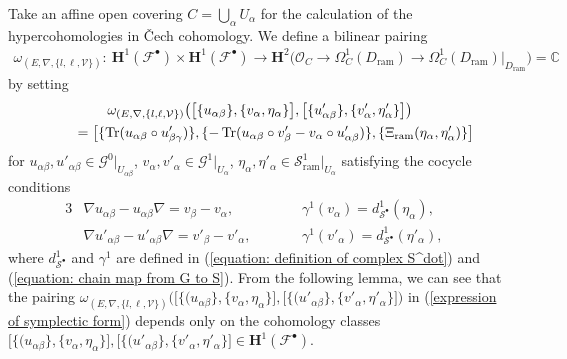 \documentclass[pdftex]{sigma}
\numberwithin{equation}{section}
\newcommand{\Tr}{\mathop{\rm Tr}\nolimits}
\begin{document}
Take an affine open covering
$C=\bigcup_{\alpha} U_{\alpha}$
for the calculation of the hypercohomologies in \v{C}ech cohomology.
We define a bilinear pairing
\begin{gather} \label{equation: definition of symplectic form}
 \omega_{ (E,\nabla,\{ l,\ell,{\mathcal V}\}) } \colon \
 \mathbf{H}^1({\mathcal F}^{\bullet}) \times \mathbf{H}^1({\mathcal F}^{\bullet})
 \longrightarrow
 \mathbf{H}^2\big({\mathcal O}_C \rightarrow \Omega^1_C(D_{\mathrm{ram}})
 \rightarrow \Omega^1_C(D_{\mathrm{ram}})|_{D_{\mathrm{ram}}} \big)
 = \mathbb{C}
\end{gather}
by setting
\begin{gather}
 \omega_{ (E,\nabla,\{ l,\ell,{\mathcal V}\}) }
\big( \big[ \{ u_{\alpha\beta}\},
 \{ v_{\alpha}, \eta_{\alpha} \} \big] ,
 \big[ \{ u'_{\alpha\beta}\},
 \{ v'_{\alpha}, \eta'_{\alpha} \} \big]
\big)
 \nonumber\\
\qquad{}=
\big[
 \{ \Tr(u_{\alpha\beta}\circ u'_{\beta\gamma})\},
 \{ {-}\Tr(u_{\alpha\beta}\circ v'_{\beta}-v_{\alpha}\circ u'_{\alpha\beta})\},
 \{\Xi_{\mathrm{ram}}( \eta_{\alpha} , \eta'_{\alpha} )
 \}
\big] \label{expression of symplectic form}
\end{gather}
for
$u_{\alpha\beta},u'_{\alpha\beta}\in {\mathcal G}^0|_{U_{\alpha\beta}}$,
$v_{\alpha},v'_{\alpha}\in {\mathcal G}^1|_{U_{\alpha}}$,
$\eta_{\alpha},\eta'_{\alpha}
\in {\mathcal S}^1_{\mathrm{ram}}|_{U_{\alpha}}$
satisfying the cocycle conditions
\begin{alignat*}{3}
& \nabla u_{\alpha\beta}-u_{\alpha\beta}\nabla
=
 v_{\beta}-v_{\alpha} ,
 \qquad&&
 \gamma^1(v_{\alpha}) = d^1_{{\mathcal S}^{\bullet}}(\eta_{\alpha}) ,&
 \\
 &\nabla u'_{\alpha\beta}-u'_{\alpha\beta}\nabla
=
 v'_{\beta}-v'_{\alpha} ,
 \qquad&&
 \gamma^1(v'_{\alpha})
 =d^1_{{\mathcal S}^{\bullet}}(\eta'_{\alpha}),&
\end{alignat*}
where $d^1_{{\mathcal S}^{\bullet}}$ and $\gamma^1$ are defined in
(\ref{equation: definition of complex S^dot}) and
(\ref{equation: chain map from G to S}).
From the following lemma,
we can see that the pairing
$\omega_{ (E,\nabla,\{ l,\ell,{\mathcal V}\}) } \big( \big[ \{ (u_{\alpha\beta}\},
 \{ v_{\alpha}, \eta_{\alpha} \} \big] ,
 \big[ \{ (u'_{\alpha\beta}\},
 \{ v'_{\alpha}, \eta'_{\alpha} \} \big]
 \big)$
in (\ref{expression of symplectic form})
depends only on the cohomology classes
$ \big[ \{ (u_{\alpha\beta}\},
 \{ v_{\alpha}, \eta_{\alpha} \} \big] ,
 \big[ \{ (u'_{\alpha\beta}\},
 \{ v'_{\alpha}, \eta'_{\alpha} \} \big]
\in \mathbf{H}^1({\mathcal F}^{\bullet})$.
\end{document}
